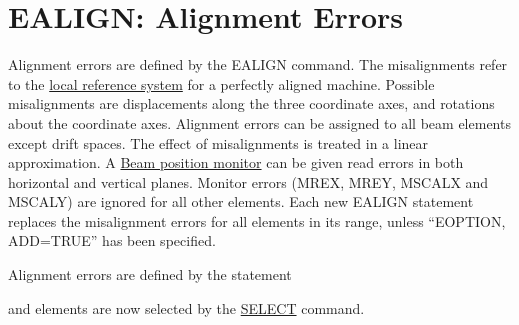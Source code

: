 \section{EALIGN: Alignment Errors} %
\label{sec:ealign}

Alignment errors are defined by the EALIGN command. 
The misalignments refer to the
\href{../Introduction/local_system.html}{local reference system} for a
perfectly aligned machine.  
Possible misalignments are displacements along the three coordinate
axes, and rotations about the coordinate axes. 
Alignment errors can be assigned to all beam elements except drift
spaces. 
The effect of misalignments is treated in a linear
approximation. 
A \href{read HREF=../Introduction/monitors.html}{Beam
  position monitor} can be given read errors in both horizontal and
vertical planes. Monitor errors (MREX, MREY, MSCALX and MSCALY) are
ignored for all other elements. Each new EALIGN statement replaces the
misalignment errors for all elements in its range, unless ``EOPTION,
ADD=TRUE'' has been specified.   

Alignment errors are defined by the statement 

and elements are now selected by the
\href{../Introduction/select.html}{SELECT} command. 

